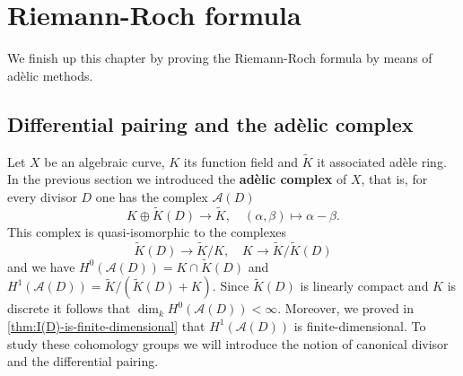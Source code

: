 \section{Riemann-Roch formula}
We finish up this chapter by proving the Riemann-Roch formula by means of adèlic methods. 

\subsection{Differential pairing and the adèlic complex}
Let $X$ be an algebraic curve, $K$ its function field and $\widetilde{K}$ it associated adèle ring. In the previous section we introduced the \textbf{adèlic complex} of $X$, that is, for every divisor $D$ one has the complex $\mathcal{A}(D)$ 
\[
	K\oplus \widetilde{K}(D) \to \widetilde{K}, \quad (\alpha,\beta) \mapsto \alpha - \beta.
\]
This complex is quasi-isomorphic to the complexes
\[
	\widetilde{K}(D) \to \widetilde{K}/K, \quad K\to \widetilde{K}/\widetilde{K}(D)
\]
and we have $H^{0}(\mathcal{A}(D)) = K \cap \widetilde{K}(D)$ and $H^{1}(\mathcal{A}(D)) = \widetilde{K}/(\widetilde{K}(D) + K)$. Since $\widetilde{K}(D)$ is linearly compact and $K$ is discrete it follows that $\dim_{k}H^{0}(\mathcal{A}(D)) < \infty$. Moreover, we proved in \cref{thm:I(D)-is-finite-dimensional} that $H^{1}(\mathcal{A}(D))$ is finite-dimensional. To study these cohomology groups we will introduce the notion of canonical divisor and the differential pairing.
\vspace{5mm}

